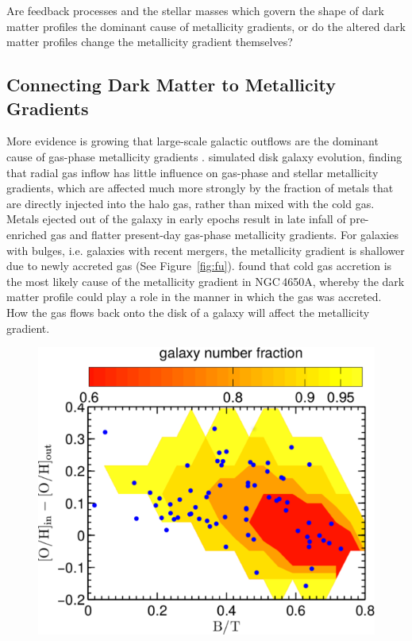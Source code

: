 \documentclass[11pt, a4paper, onecolumn]{article}
\begin{document}
\begin{multicols}{2}
    Are feedback processes and the stellar masses which govern the shape of
    dark matter profiles the dominant cause of metallicity gradients, or do the
    altered dark matter profiles change the metallicity gradient themselves?

\subsection{Connecting Dark Matter to Metallicity Gradients}

    More evidence is growing that large-scale galactic outflows are the
    dominant cause of gas-phase metallicity gradients
    \citet{martel13,jones13}.  \citet{fu13} simulated disk galaxy evolution,
    finding that radial gas inflow has little influence on gas-phase and
    stellar metallicity gradients, which are affected much more strongly by the
    fraction of metals that are directly injected into the halo gas, rather
    than mixed with the cold gas.  Metals ejected out of the galaxy in early
    epochs result in late infall of pre-enriched gas and flatter present-day
    gas-phase metallicity gradients.  For galaxies with bulges, i.e. galaxies
    with recent mergers, the metallicity gradient is shallower due to newly
    accreted gas (See Figure~\ref{fig:fu}). \citet{spavone10} found that cold
    gas accretion is the most likely cause of the metallicity gradient in
    NGC\,4650A, whereby the dark matter profile could play a role in the manner
    in which the gas was accreted. How the gas flows back onto the disk of a
    galaxy will affect the metallicity gradient.
    
    \begin{figure}[!ht]

        \centering

        \includegraphics[scale=0.4]{figures/fu13_fig12.pdf}


\end{figure}
\end{multicols}
\end{document}
